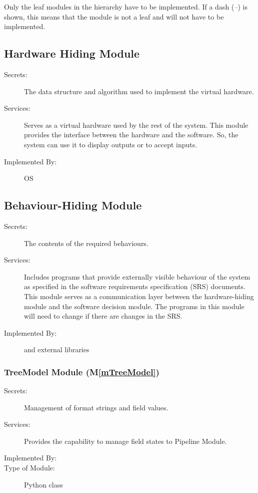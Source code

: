 \documentclass[12pt, titlepage]{article}
\newcommand{\mref}[1]{M\ref{#1}}
\begin{document}
Only the leaf modules in the hierarchy have to be implemented. If a dash (\emph{--}) is shown, this means that the module is not a leaf and will not have to be implemented.




\subsection{Hardware Hiding Module}


\begin{description}
    \item[Secrets:]The data structure and algorithm used to implement the virtual hardware.
    \item[Services:]Serves as a virtual hardware used by the rest of the system. This module provides the interface between the hardware and the software. So, the system can use it to display outputs or to accept inputs.
    \item[Implemented By:] OS
\end{description}




\subsection{Behaviour-Hiding Module}


\begin{description}
    \item[Secrets:]The contents of the required behaviours.
    \item[Services:]Includes programs that provide externally visible behaviour of the system as specified in the software requirements specification (SRS) documents. This module serves as a communication layer between the hardware-hiding module and the software decision module. The programs in this module will need to change if there are changes in the SRS.
    \item[Implemented By:] \progname and external libraries
\end{description}




\subsubsection{TreeModel Module (\mref{mTreeModel})}


\begin{description}
    \item[Secrets:] Management of format strings and field values.
    \item[Services:] Provides the capability to manage field states to Pipeline Module.
    \item[Implemented By:] \progname
    \item[Type of Module:] Python class
\end{description}
\end{document}

